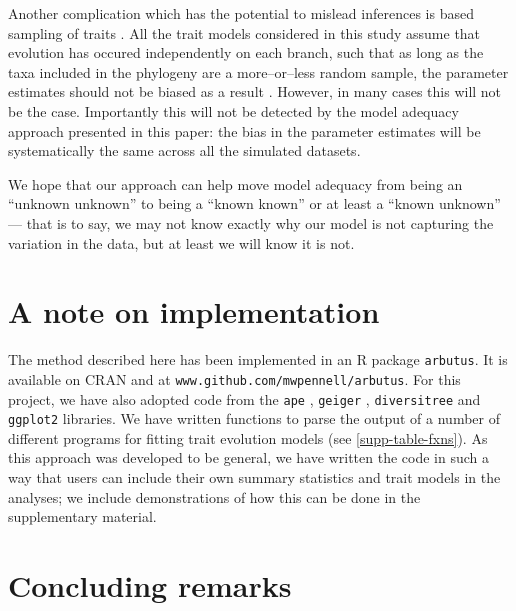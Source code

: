 \documentclass[a4paper,12pt]{article}
\begin{document}
Another complication which has the potential to mislead inferences is based sampling of traits \citep{Freckletoninaction, FitzJohnwoody}. All the trait models considered in this study assume that evolution has occured independently on each branch, such that as long as the taxa included in the phylogeny are a more--or--less random sample, the parameter estimates should not be biased as a result \citep{PennellHarmon}. However, in many cases \citep[especially when using large trait databases;][]{FitzJohnwoody} this will not be the case. Importantly this will not be detected by the model adequacy approach presented in this paper: the bias in the parameter estimates will be systematically the same across all the simulated datasets.

We hope that our approach can help move model adequacy from being an ``unknown unknown''  to being a ``known known'' or at least a ``known unknown'' --- that is to say, we may not know exactly why our model is not capturing the variation in the data, but at least we will know it is not.


\section*{A note on implementation}

The method described here has been implemented in an R package \texttt{arbutus}. It is available on CRAN and at \texttt{www.github.com/mwpennell/arbutus}. For this project, we have also adopted code from the \texttt{ape} \citep{ape}, \texttt{geiger} \citep{geiger}, \texttt{diversitree} \citep{FitzJohn2012} and \texttt{ggplot2} \citep{ggplot2} libraries. We have written functions to parse the output of a number of different programs for fitting trait evolution models (see \ref{supp-table-fxns}). As this approach was developed to be general, we have written the code in such a way that users can include their own summary statistics and trait models in the analyses; we include demonstrations of how this can be done in the supplementary material.

\section*{Concluding remarks}
\end{document}

